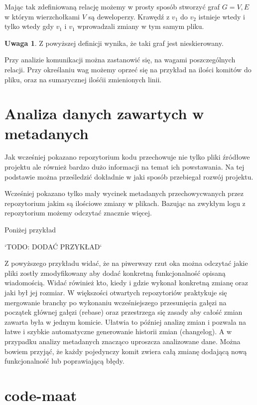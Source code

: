 \documentclass[a4paper,11pt,twoside]{report}
\theoremstyle{definition}
\newtheorem{remark}[theorem]{Uwaga}
\begin{document}
Mając tak zdefiniowaną relację możemy w prosty sposób stworzyć graf $G = 
{V,E}$ w którym wierzchołkami $V$ są deweloperzy. Krawędź z $v_1$ do $v_2$ 
istnieje wtedy i tylko wtedy gdy $v_1$ i $v_1$ wprowadzali zmiany w tym samym 
pliku.

\begin{remark}
Z powyższej definicji wynika, że taki graf jest nieskierowany.
\end{remark}

Przy analizie komunikacji można zastanowić się, na wagami poszczególnych 
relacji. Przy określaniu wag możemy oprzeć się na przykład na ilości 
komitów do pliku, oraz na sumarycznej ilośćii zmienionych linii.

\section{Analiza danych zawartych w metadanych}
Jak wcześniej pokazano repozytorium kodu przechowuje nie tylko pliki 
źródłowe projektu ale również bardzo dużo informacji na temat ich 
powstawania. Na tej podstawie można prześledzić dokładnie w jaki sposób 
przebiegał rozwój projektu.

Wcześniej pokazano tylko mały wycinek metadanych przechowycwanych przez 
repozytorium jakim są ilościowe zmiany w plikach. Bazując na zwykłym logu z 
repozytorium możemy odczytać znacznie więcej.

Poniżej przykład

    `TODO: DODAĆ PRZYKŁAD`

Z powyższego przykładu widać, że na piwerwszy rzut oka można odczytać 
jakie pliki zostły zmodyfikowany aby dodać konkretną funkcjonalność 
opisaną wiadomością. Widać rówinież kto, kiedy i gdzie wykonał 
konkretną zmianę oraz jaki był jej rozmiar.
 W większości otwartych repozytoriów praktykuje się mergowanie branchy po 
wykonaniu wcześniejszego przesunięcia gałęzi na początek głównej 
gałęzi (rebase) oraz przestrzega się zasady aby całość zmian zawarta 
była w jednym komicie. Ułatwia to później analizę zmian i pozwala na 
łatwe i szybkie automatyczne generowanie historii zmian (changelog). A w 
przypadku analizy metadanych znacząco uproszcza analizowane dane. Można 
bowiem przyjąć, że każdy pojedynczy komit zwiera całą zmianę dodającą 
nową funkcjonalność lub poprawiającą błędy.
 
 \section{code-maat}
 
\end{document}
